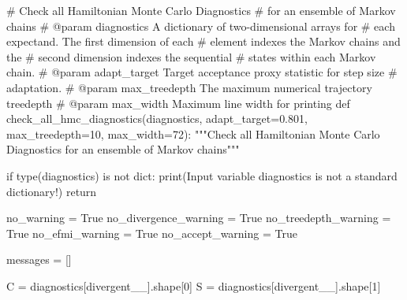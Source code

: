 \documentclass[
  letterpaper,
  DIV=11,
  numbers=noendperiod]{scrartcl}
\newenvironment{Shaded}{\begin{snugshade}}{\end{snugshade}}
\newcommand{\BuiltInTok}[1]{\textcolor[rgb]{0.00,0.23,0.31}{#1}}
\newcommand{\CommentTok}[1]{\textcolor[rgb]{0.37,0.37,0.37}{#1}}
\newcommand{\ControlFlowTok}[1]{\textcolor[rgb]{0.00,0.23,0.31}{#1}}
\newcommand{\DecValTok}[1]{\textcolor[rgb]{0.68,0.00,0.00}{#1}}
\newcommand{\FloatTok}[1]{\textcolor[rgb]{0.68,0.00,0.00}{#1}}
\newcommand{\KeywordTok}[1]{\textcolor[rgb]{0.00,0.23,0.31}{#1}}
\newcommand{\NormalTok}[1]{\textcolor[rgb]{0.00,0.23,0.31}{#1}}
\newcommand{\OperatorTok}[1]{\textcolor[rgb]{0.37,0.37,0.37}{#1}}
\newcommand{\StringTok}[1]{\textcolor[rgb]{0.13,0.47,0.30}{#1}}
\newcommand{\VariableTok}[1]{\textcolor[rgb]{0.07,0.07,0.07}{#1}}
\begin{document}
\begin{Shaded}
\begin{Highlighting}[]
\CommentTok{\# Check all Hamiltonian Monte Carlo Diagnostics }
\CommentTok{\# for an ensemble of Markov chains}
\CommentTok{\# @param diagnostics A dictionary of two{-}dimensional arrays for }
\CommentTok{\#                    each expectand.  The first dimension of each}
\CommentTok{\#                    element indexes the Markov chains and the }
\CommentTok{\#                    second dimension indexes the sequential }
\CommentTok{\#                    states within each Markov chain.}
\CommentTok{\# @param adapt\_target Target acceptance proxy statistic for step size }
\CommentTok{\#                     adaptation.}
\CommentTok{\# @param max\_treedepth The maximum numerical trajectory treedepth}
\CommentTok{\# @param max\_width Maximum line width for printing}
\KeywordTok{def}\NormalTok{ check\_all\_hmc\_diagnostics(diagnostics,}
\NormalTok{                              adapt\_target}\OperatorTok{=}\FloatTok{0.801}\NormalTok{,}
\NormalTok{                              max\_treedepth}\OperatorTok{=}\DecValTok{10}\NormalTok{,}
\NormalTok{                              max\_width}\OperatorTok{=}\DecValTok{72}\NormalTok{):}
  \CommentTok{"""Check all Hamiltonian Monte Carlo Diagnostics for an }
\CommentTok{     ensemble of Markov chains"""}
     
  \ControlFlowTok{if} \BuiltInTok{type}\NormalTok{(diagnostics) }\KeywordTok{is} \KeywordTok{not} \BuiltInTok{dict}\NormalTok{:}
    \BuiltInTok{print}\NormalTok{(}\StringTok{\textquotesingle{}Input variable \textasciigrave{}diagnostics\textasciigrave{} is not a standard dictionary!\textquotesingle{}}\NormalTok{)}
    \ControlFlowTok{return}
  
\NormalTok{  no\_warning }\OperatorTok{=} \VariableTok{True}
\NormalTok{  no\_divergence\_warning }\OperatorTok{=} \VariableTok{True}
\NormalTok{  no\_treedepth\_warning }\OperatorTok{=} \VariableTok{True}
\NormalTok{  no\_efmi\_warning }\OperatorTok{=} \VariableTok{True}
\NormalTok{  no\_accept\_warning }\OperatorTok{=} \VariableTok{True}
  
\NormalTok{  messages }\OperatorTok{=}\NormalTok{ []}
  
\NormalTok{  C }\OperatorTok{=}\NormalTok{ diagnostics[}\StringTok{\textquotesingle{}divergent\_\_\textquotesingle{}}\NormalTok{].shape[}\DecValTok{0}\NormalTok{]}
\NormalTok{  S }\OperatorTok{=}\NormalTok{ diagnostics[}\StringTok{\textquotesingle{}divergent\_\_\textquotesingle{}}\NormalTok{].shape[}\DecValTok{1}\NormalTok{]}
  

\end{Highlighting}
\end{Shaded}
\end{document}
